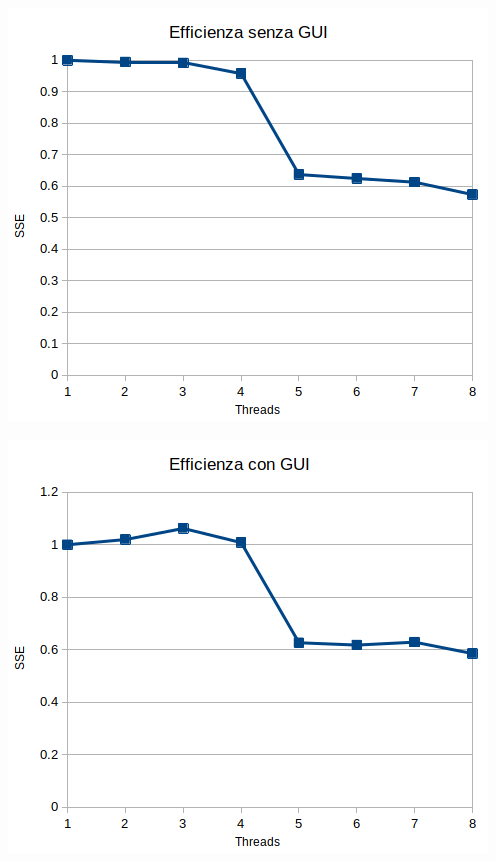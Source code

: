 \documentclass[12pt,a4paper,oneside]{article}
\begin{document}
	\hfill
	\begin{minipage}{.45\textwidth}
		\centering
		\includegraphics[width=\linewidth]{sse-no-gui}
		\label{fig:sse-no-gui}
	\end{minipage}
	\hfill
	\begin{minipage}{.45\textwidth}
		\centering
		\includegraphics[width=\linewidth]{sse-gui}
		\label{fig:sse-gui}
	\end{minipage}
	\hfill
	
\end{document}
